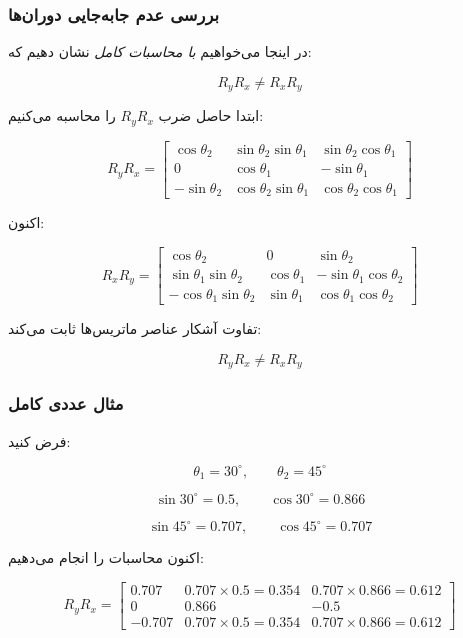 \documentclass{article}
\begin{document}
\subsubsection{بررسی عدم جابه‌جایی دوران‌ها}

در اینجا می‌خواهیم \emph{با محاسبات کامل} نشان دهیم که:

\[
R_yR_x \neq R_xR_y
\]

ابتدا حاصل ضرب $R_yR_x$ را محاسبه می‌کنیم:

\[
R_yR_x=
\begin{bmatrix}
	\cos\theta_2 &
	\sin\theta_2\sin\theta_1 &
	\sin\theta_2\cos\theta_1\\[4pt]
	0 &
	\cos\theta_1 &
	-\sin\theta_1\\[4pt]
	-\sin\theta_2 &
	\cos\theta_2\sin\theta_1 &
	\cos\theta_2\cos\theta_1
\end{bmatrix}
\]

اکنون:

\[
R_xR_y=
\begin{bmatrix}
	\cos\theta_2 & 0 & \sin\theta_2\\[4pt]
	\sin\theta_1\sin\theta_2 &
	\cos\theta_1 &
	-\sin\theta_1\cos\theta_2\\[4pt]
	-\cos\theta_1\sin\theta_2 &
	\sin\theta_1 &
	\cos\theta_1\cos\theta_2
\end{bmatrix}
\]

تفاوت آشکار عناصر ماتریس‌ها ثابت می‌کند:

\[
R_yR_x \neq R_xR_y
\]

\subsubsection{مثال عددی کامل}

فرض کنید:

\[
\theta_1=30^\circ,\qquad \theta_2=45^\circ
\]

\[
\sin30^\circ = 0.5,\qquad \cos30^\circ = 0.866
\]

\[
\sin45^\circ = 0.707,\qquad \cos45^\circ = 0.707
\]

اکنون محاسبات را انجام می‌دهیم:

\[
R_yR_x =
\begin{bmatrix}
	0.707 & 0.707\times0.5 = 0.354 & 0.707\times0.866 = 0.612\\
	0     & 0.866 & -0.5\\
	-0.707 & 0.707\times0.5 = 0.354 & 0.707\times0.866 = 0.612
\end{bmatrix}
\]
\end{document}
